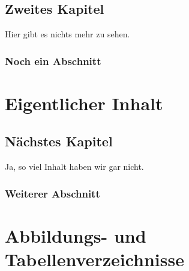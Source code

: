 \documentclass{scrbook}
\begin{document}
	\chapter{Zweites Kapitel}

		Hier gibt es nichts mehr zu sehen.

		\section{Noch ein Abschnitt}

			\lipsum

	\part{Eigentlicher Inhalt}

	\chapter{Nächstes Kapitel}

		Ja, so viel Inhalt haben wir gar nicht.

		\section{Weiterer Abschnitt}

			\lipsum

	\appendix
	\part{Abbildungs- und Tabellenverzeichnisse}
	\listoffigures
\end{document}
